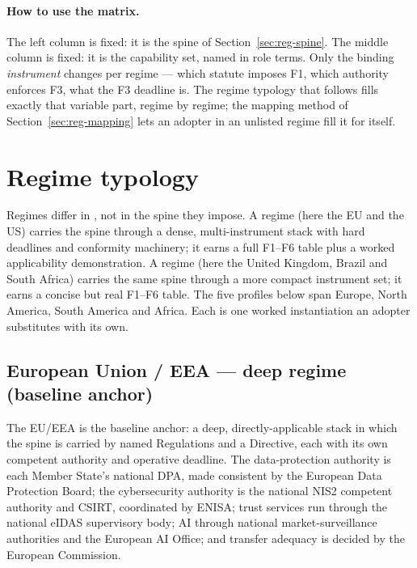 \paragraph{How to use the matrix.} The left column is fixed: it is the
spine of Section~\ref{sec:reg-spine}. The middle column is fixed: it
is the  capability set, named in role terms. Only the
binding \emph{instrument} changes per regime --- which statute imposes
F1, which authority enforces F3, what the F3 deadline is. The regime
typology that follows fills exactly that variable part, regime by
regime; the mapping method of Section~\ref{sec:reg-mapping} lets an
adopter in an unlisted regime fill it for itself.

\section{Regime typology}
\label{sec:reg-typology}

Regimes differ in , not in the spine they impose. A
 regime (here the EU and the US) carries the spine through
a dense, multi-instrument stack with hard deadlines and conformity
machinery; it earns a full F1--F6 table plus a worked applicability
demonstration. A  regime (here the United Kingdom,
Brazil and South Africa) carries the same spine through a more compact
instrument set; it earns a concise but real F1--F6 table. The five
profiles below span Europe, North America, South America and Africa.
Each is one worked instantiation an adopter substitutes with its own.

\subsection{European Union / EEA --- deep regime (baseline anchor)}
\label{sec:reg-eu}

The EU/EEA is the  baseline anchor: a deep,
directly-applicable stack in which the spine is carried by named
Regulations and a Directive, each with its own competent authority and
operative deadline. The data-protection authority is each Member
State's national DPA, made consistent by the European Data Protection
Board; the cybersecurity authority is the national NIS2 competent
authority and CSIRT, coordinated by ENISA; trust services run through
the national eIDAS supervisory body; AI through national
market-surveillance authorities and the European AI Office; and
transfer adequacy is decided by the European Commission.

